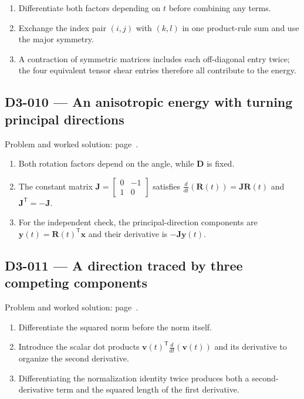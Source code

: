 \documentclass[11pt,oneside,openany]{book}
\begin{document}
\begin{enumerate}
\item Differentiate both factors depending on \(t\) before combining any terms.
\item Exchange the index pair \((i,j)\) with \((k,l)\) in one product-rule sum and use the major symmetry.
\item A contraction of symmetric matrices includes each off-diagonal entry twice; the four equivalent tensor shear entries therefore all contribute to the energy.
\end{enumerate}
\subsection*{D3-010 --- An anisotropic energy with turning principal directions}
\label{hints:D3-010}
Problem and worked solution: page~\pageref{problem:D3-010}.

\begin{enumerate}
\item Both rotation factors depend on the angle, while \(\mathbf D\) is fixed.
\item The constant matrix \(\mathbf J=\begin{bmatrix}0&-1\\1&0\end{bmatrix}\) satisfies \(\frac{d}{dt}(\mathbf R(t))=\mathbf J\mathbf R(t)\) and \(\mathbf J^{\mathsf T}=-\mathbf J\).
\item For the independent check, the principal-direction components are \(\mathbf y(t)=\mathbf R(t)^{\mathsf T}\mathbf x\) and their derivative is \(-\mathbf J\mathbf y(t)\).
\end{enumerate}
\subsection*{D3-011 --- A direction traced by three competing components}
\label{hints:D3-011}
Problem and worked solution: page~\pageref{problem:D3-011}.

\begin{enumerate}
\item Differentiate the squared norm before the norm itself.
\item Introduce the scalar dot products \(\mathbf v(t)^{\mathsf T}\frac{d}{dt}(\mathbf v(t))\) and its derivative to organize the second derivative.
\item Differentiating the normalization identity twice produces both a second-derivative term and the squared length of the first derivative.
\end{enumerate}
\end{document}
